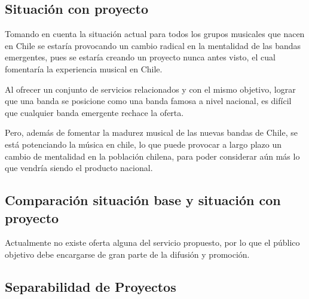 \subsection{Situación con proyecto}


Tomando en cuenta la situación actual para todos los grupos musicales
que nacen en Chile se estaría provocando un cambio radical en la mentalidad
de las bandas emergentes, pues se estaría creando un proyecto
nunca antes visto, el cual fomentaría la experiencia musical en Chile.

Al ofrecer un conjunto de servicios relacionados y con el mismo objetivo,
lograr que una banda se posicione como una banda famosa a nivel nacional,
es difícil que cualquier banda emergente rechace la oferta.

Pero, además de fomentar la madurez musical de las nuevas bandas
de Chile, se está potenciando la música en chile,
lo que puede provocar a largo plazo un cambio de mentalidad
en la población chilena, para poder considerar aún más
lo que vendría siendo el producto nacional.

\subsection{Comparación situación base y situación con proyecto}

Actualmente no existe oferta alguna del servicio propuesto, por lo que el
público objetivo debe encargarse de gran parte de la difusión y promoción.

\subsection{Separabilidad de Proyectos}

%


